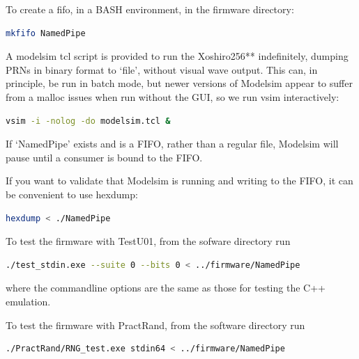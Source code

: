 \documentclass{article}
\begin{document}
To create a fifo, in a BASH environment, in the firmware directory:

\begin{minipage}{1.0\textwidth}
\centering
\begin{lstlisting}[language=bash, label=lst:MakeFifo]
mkfifo NamedPipe
\end{lstlisting}
\end{minipage}

A modelsim tcl script is provided to run the Xoshiro256** indefinitely, dumping PRNs in binary format to `file', without visual wave output. This can, in principle, be run in batch mode, but newer versions of Modelsim appear to suffer from a malloc issues when run without the GUI, so we run vsim interactively:

\begin{minipage}{1.0\textwidth}
\centering
\begin{lstlisting}[language=bash, label=lst:ModelsimNoGui]
vsim -i -nolog -do modelsim.tcl &
\end{lstlisting}
\end{minipage}

If `NamedPipe' exists and is a FIFO, rather than a regular file, Modelsim will pause until a consumer is bound to the FIFO.

If you want to validate that Modelsim is running and writing to the FIFO, it can be convenient to use hexdump:

\begin{minipage}{1.0\textwidth}
\centering
\begin{lstlisting}[language=bash, label=lst:HexDumpPipe]
hexdump < ./NamedPipe
\end{lstlisting}
\end{minipage}

To test the firmware with TestU01, from the sofware directory run 

\begin{minipage}{1.0\textwidth}
\centering
\begin{lstlisting}[language=bash, label=lst:TestU01Pipe]
./test_stdin.exe --suite 0 --bits 0 < ../firmware/NamedPipe
\end{lstlisting}
\end{minipage}

where the commandline options are the same as those for testing the C++ emulation.

To test the firmware with PractRand, from the software directory run 

\begin{minipage}{1.0\textwidth}
\centering
\begin{lstlisting}[language=bash , label=lst:PractRandPipe]
./PractRand/RNG_test.exe stdin64 < ../firmware/NamedPipe
\end{lstlisting}
\end{minipage}
\end{document}
